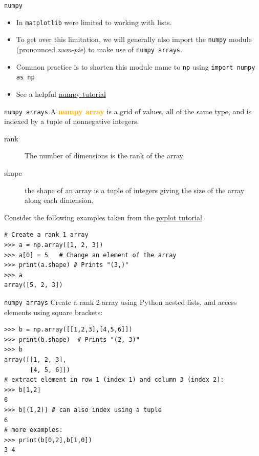 \documentclass[xcolor=svgnames]{beamer}
\newcommand{\nl}{\\[1em]}
\newcommand{\define}[1]{\textbf{\textcolor{orange}{#1}}}
\begin{document}
\begin{frame}[fragile]{\tt numpy}
\begin{itemize}
\item In {\tt matplotlib} were limited to working with lists.\nl
\item To get over this limitation, we will generally also import the {\tt numpy} module (pronounced \textit{num}-\textit{pie}) to make use of {\tt numpy arrays}.\nl


\item Common practice is to shorten this module name to {\tt np} using \verb|import numpy as np|\nl

\item See a helpful \href{http://cs231n.github.io/python-numpy-tutorial/}{numpy tutorial}
\end{itemize}

\end{frame}

\begin{frame}[fragile]{\tt numpy arrays}
 A \define{numpy array} is a grid of values, all of the same type, and is indexed by a tuple of nonnegative integers. 
\begin{description}
\item[rank] The number of dimensions is the rank of the array
\item[shape] the shape of an array is a tuple of integers giving the size of the array along each dimension.
\end{description}
Consider the following examples taken from  the \href{https://matplotlib.org/3.1.0/tutorials/introductory/pyplot.html}{pyplot tutorial}
\begin{Verbatim}[frame=single]
# Create a rank 1 array
>>> a = np.array([1, 2, 3])   
>>> a[0] = 5   # Change an element of the array
>>> print(a.shape) # Prints "(3,)"
>>> a
array([5, 2, 3])
\end{Verbatim}
\end{frame}


\begin{frame}[fragile]{\tt numpy arrays}
Create a rank 2 array using Python nested lists, and access elements using square brackets:
\begin{Verbatim}[frame=single]
>>> b = np.array([[1,2,3],[4,5,6]])    
>>> print(b.shape)  # Prints "(2, 3)"
>>> b
array([[1, 2, 3],
       [4, 5, 6]])
# extract element in row 1 (index 1) and column 3 (index 2):
>>> b[1,2]
6
>>> b[(1,2)] # can also index using a tuple
6
# more examples:
>>> print(b[0,2],b[1,0])
3 4
\end{Verbatim}
\end{frame}
\end{document}
